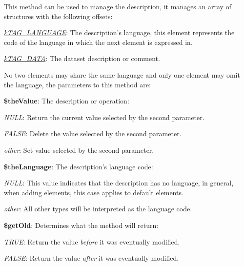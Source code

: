 This method can be used to manage the \hyperlink{}{description}, it manages an array of structures with the following offsets\-:


\begin{DoxyItemize}
\item {\itshape \hyperlink{}{k\-T\-A\-G\-\_\-\-L\-A\-N\-G\-U\-A\-G\-E}}\-: The description's language, this element represents the code of the language in which the next element is expressed in. 
\item {\itshape \hyperlink{}{k\-T\-A\-G\-\_\-\-D\-A\-T\-A}}\-: The dataset description or comment. 
\end{DoxyItemize}

No two elements may share the same language and only one element may omit the language, the parameters to this method are\-:


\begin{DoxyItemize}
\item {\bfseries \$the\-Value}\-: The description or operation\-: 
\begin{DoxyItemize}
\item {\itshape N\-U\-L\-L}\-: Return the current value selected by the second parameter. 
\item {\itshape F\-A\-L\-S\-E}\-: Delete the value selected by the second parameter. 
\item {\itshape other}\-: Set value selected by the second parameter. 
\end{DoxyItemize}
\item {\bfseries \$the\-Language}\-: The description's language code\-: 
\begin{DoxyItemize}
\item {\itshape N\-U\-L\-L}\-: This value indicates that the description has no language, in general, when adding elements, this case applies to default elements. 
\item {\itshape other}\-: All other types will be interpreted as the language code. 
\end{DoxyItemize}
\item {\bfseries \$get\-Old}\-: Determines what the method will return\-: 
\begin{DoxyItemize}
\item {\itshape T\-R\-U\-E}\-: Return the value {\itshape before} it was eventually modified. 
\item {\itshape F\-A\-L\-S\-E}\-: Return the value {\itshape after} it was eventually modified. 
\end{DoxyItemize}
\end{DoxyItemize}


